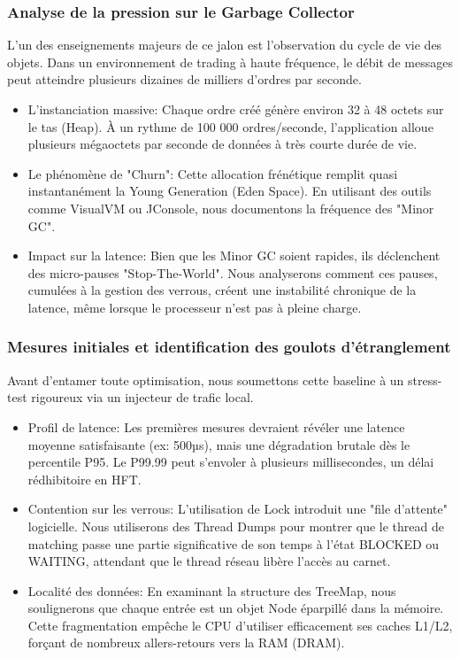 \subsubsection{Analyse de la pression sur le Garbage Collector}

L'un des enseignements majeurs de ce jalon est l'observation du cycle de vie des objets. Dans un environnement de trading à haute fréquence, le débit de messages peut atteindre plusieurs dizaines de milliers d'ordres par seconde.

\begin{itemize}
    \item L'instanciation massive: Chaque ordre créé génère environ 32 à 48 octets sur le tas (Heap). À un rythme de 100 000 ordres/seconde, l'application alloue plusieurs mégaoctets par seconde de données à très courte durée de vie.
    \item Le phénomène de "Churn": Cette allocation frénétique remplit quasi instantanément la Young Generation (Eden Space). En utilisant des outils comme VisualVM ou JConsole, nous documentons la fréquence des "Minor GC".
    \item Impact sur la latence: Bien que les Minor GC soient rapides, ils déclenchent des micro-pauses "Stop-The-World". Nous analyserons comment ces pauses, cumulées à la gestion des verrous, créent une instabilité chronique de la latence, même lorsque le processeur n'est pas à pleine charge.
\end{itemize}

\subsubsection{Mesures initiales et identification des goulots d'étranglement}

Avant d'entamer toute optimisation, nous soumettons cette baseline à un stress-test rigoureux via un injecteur de trafic local.

\begin{itemize}
    \item Profil de latence: Les premières mesures devraient révéler une latence moyenne satisfaisante (ex: 500µs), mais une dégradation brutale dès le percentile P95. Le P99.99 peut s'envoler à plusieurs millisecondes, un délai rédhibitoire en HFT.
    \item Contention sur les verrous: L'utilisation de Lock introduit une "file d'attente" logicielle. Nous utiliserons des Thread Dumps pour montrer que le thread de matching passe une partie significative de son temps à l'état BLOCKED ou WAITING, attendant que le thread réseau libère l'accès au carnet.
    \item Localité des données: En examinant la structure des TreeMap, nous soulignerons que chaque entrée est un objet Node éparpillé dans la mémoire. Cette fragmentation empêche le CPU d'utiliser efficacement ses caches L1/L2, forçant de nombreux allers-retours vers la RAM (DRAM).
\end{itemize}

